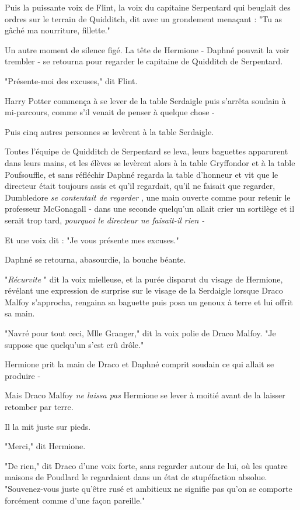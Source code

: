 Puis la puissante voix de Flint, la voix du capitaine Serpentard qui beuglait des ordres sur le terrain de Quidditch, dit avec un grondement menaçant : "Tu as gâché ma nourriture, fillette."

Un autre moment de silence figé. La tête de Hermione - Daphné pouvait la voir trembler - se retourna pour regarder le capitaine de Quidditch de Serpentard.

"Présente-moi des excuses," dit Flint.

Harry Potter commença à se lever de la table Serdaigle puis s'arrêta soudain à mi-parcours, comme s'il venait de penser à quelque chose -

Puis cinq autres personnes se levèrent à la table Serdaigle.

Toutes l'équipe de Quidditch de Serpentard se leva, leurs baguettes apparurent dans leurs mains, et les élèves se levèrent alors à la table Gryffondor et à la table Poufsouffle, et sans réfléchir Daphné regarda la table d'honneur et vit que le directeur était toujours assis et qu'il regardait, qu'il ne faisait que regarder, Dumbledore \emph{se contentait de regarder} , une main ouverte comme pour retenir le professeur McGonagall - dans une seconde quelqu'un allait crier un sortilège et il serait trop tard, \emph{pourquoi le directeur ne faisait-il rien -} 

Et une voix dit : "Je vous présente mes excuses."

Daphné se retourna, abasourdie, la bouche béante.

"\emph{Récurvite} " dit la voix mielleuse, et la purée disparut du visage de Hermione, révélant une expression de surprise sur le visage de la Serdaigle lorsque Draco Malfoy s'approcha, rengaina sa baguette puis posa un genoux à terre et lui offrit sa main.

"Navré pour tout ceci, Mlle Granger," dit la voix polie de Draco Malfoy. "Je suppose que quelqu'un s'est crû drôle."

Hermione prit la main de Draco et Daphné comprit soudain ce qui allait se produire -

Mais Draco Malfoy \emph{ne laissa pas}  Hermione se lever à moitié avant de la laisser retomber par terre.

Il la mit juste sur pieds.

"Merci," dit Hermione.

"De rien," dit Draco d'une voix forte, sans regarder autour de lui, où les quatre maisons de Poudlard le regardaient dans un état de stupéfaction absolue. "Souvenez-vous juste qu'être rusé et ambitieux ne signifie pas qu'on se comporte forcément comme d'une façon pareille."

